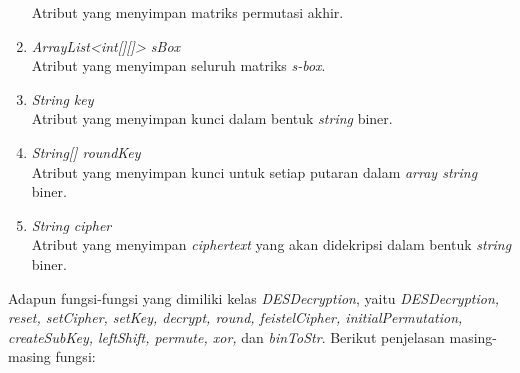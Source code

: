 \begin{enumerate}
	Atribut yang menyimpan matriks permutasi akhir.
	\item \textit{ArrayList<int[][]> sBox} \\
	Atribut yang menyimpan seluruh matriks \textit{s-box}.
	\item \textit{String key} \\
	Atribut yang menyimpan kunci dalam bentuk \textit{string} biner.
	\item \textit{String[] roundKey} \\
	Atribut yang menyimpan kunci untuk setiap putaran dalam \textit{array string} biner.
	\item \textit{String cipher} \\
	Atribut yang menyimpan \textit{ciphertext} yang akan didekripsi dalam bentuk \textit{string} biner.
\end{enumerate}

Adapun fungsi-fungsi yang dimiliki kelas \textit{DESDecryption}, yaitu \textit{DESDecryption, reset, setCipher, setKey, decrypt, round, feistelCipher, initialPermutation, createSubKey, leftShift, permute, xor,} dan \textit{binToStr}. Berikut penjelasan masing-masing fungsi:

